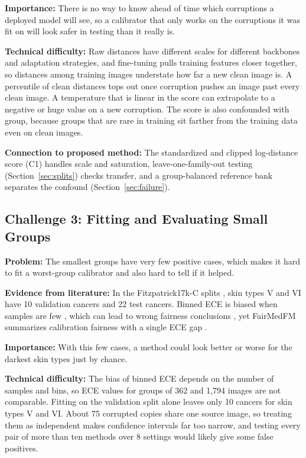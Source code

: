\documentclass[sigconf,nonacm]{acmart}
\begin{document}
\textbf{Importance:} There is no way to know ahead of time which corruptions a deployed model will see, so a calibrator that only works on the corruptions it was fit on will look safer in testing than it really is.

\textbf{Technical difficulty:} Raw distances have different scales for different backbones and adaptation strategies, and fine-tuning pulls training features closer together, so distances among training images understate how far a new clean image is. A percentile of clean distances tops out once corruption pushes an image past every clean image. A temperature that is linear in the score can extrapolate to a negative or huge value on a new corruption. The score is also confounded with group, because groups that are rare in training sit farther from the training data even on clean images.

\textbf{Connection to proposed method:} The standardized and clipped log-distance score (C1) handles scale and saturation, leave-one-family-out testing (Section~\ref{sec:splits}) checks transfer, and a group-balanced reference bank separates the confound (Section~\ref{sec:failure}).

\subsection{Challenge 3: Fitting and Evaluating Small Groups}
\label{sec:ch3}

\textbf{Problem:} The smallest groups have very few positive cases, which makes it hard to fit a worst-group calibrator and also hard to tell if it helped.

\textbf{Evidence from literature:} In the Fitzpatrick17k-C splits \cite{abhishek2025quality}, skin types V and VI have 10 validation cancers and 22 test cancers. Binned ECE is biased when samples are few \cite{kumar2019verified,roelofs2022mitigating}, which can lead to wrong fairness conclusions \cite{riccilara2023calibration}, yet FairMedFM summarizes calibration fairness with a single ECE gap \cite{jin2024fairmedfm}.

\textbf{Importance:} With this few cases, a method could look better or worse for the darkest skin types just by chance.

\textbf{Technical difficulty:} The bias of binned ECE depends on the number of samples and bins, so ECE values for groups of 362 and 1,794 images are not comparable. Fitting on the validation split alone leaves only 10 cancers for skin types V and VI. About 75 corrupted copies share one source image, so treating them as independent makes confidence intervals far too narrow, and testing every pair of more than ten methods over 8 settings would likely give some false positives.
\end{document}
